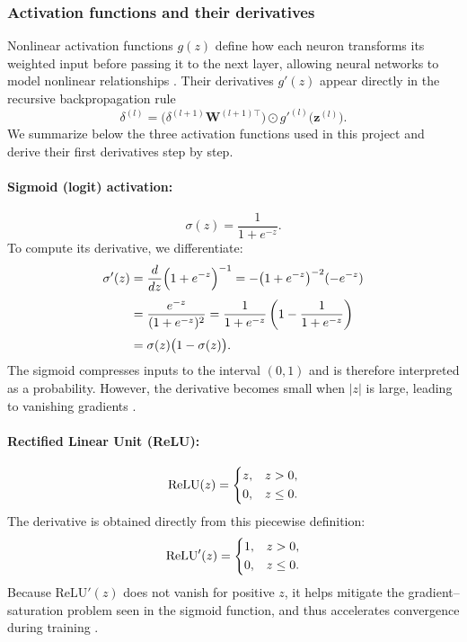 \documentclass[amssymb,twocolumn,aps]{revtex4}
\begin{document}
\subsubsection{Activation functions and their derivatives}
Nonlinear activation functions $g(z)$ define how each neuron transforms its
weighted input before passing it to the next layer, allowing neural networks
to model nonlinear relationships
\cite{goodfellow2016,deisenroth2020,compfys}.
Their derivatives $g'(z)$ appear directly in the recursive backpropagation
rule
\[
\delta^{(l)} = \bigl(\delta^{(l+1)} \mathbf{W}^{(l+1)\top}\bigr)
\odot g'^{(l)}\bigl(\mathbf{z}^{(l)}\bigr).
\]
We summarize below the three activation functions used in this project and
derive their first derivatives step by step.

\medskip
\paragraph{Sigmoid (logit) activation:}
\[
\sigma(z) = \frac{1}{1 + e^{-z}}.
\]
To compute its derivative, we differentiate:
\begin{align}
\sigma'(z)
&= \frac{d}{dz} \Bigl(1 + e^{-z}\Bigr)^{-1}
 = -\bigl(1 + e^{-z}\bigr)^{-2}(-e^{-z}) \nonumber\\[3pt]
&= \frac{e^{-z}}{(1 + e^{-z})^2}
 = \frac{1}{1 + e^{-z}}
   \left(1 - \frac{1}{1 + e^{-z}}\right) \nonumber\\[3pt]
&= \sigma(z)\bigl(1 - \sigma(z)\bigr).
\end{align}
The sigmoid compresses inputs to the interval $(0,1)$ and is therefore
interpreted as a probability. However, the derivative becomes small when
$|z|$ is large, leading to vanishing gradients
\cite{nielsen2015,goodfellow2016}.

\medskip
\paragraph{Rectified Linear Unit (ReLU):}
\[
\mathrm{ReLU}(z) =
\begin{dcases}
z, & z > 0,\\
0, & z \le 0.
\end{dcases}
\]
The derivative is obtained directly from this piecewise definition:
\[
\mathrm{ReLU}'(z) =
\begin{dcases}
1, & z > 0,\\
0, & z \le 0.
\end{dcases}
\]
Because $\mathrm{ReLU}'(z)$ does not vanish for positive $z$, it helps
mitigate the gradient--saturation problem seen in the sigmoid function, and thus accelerates convergence during training
\cite{goodfellow2016,deisenroth2020}.
\end{document}

